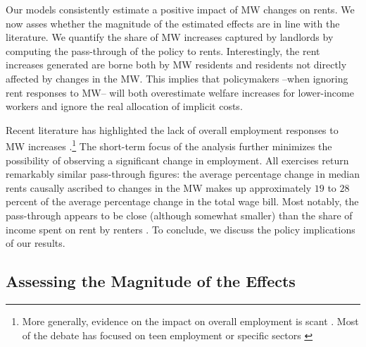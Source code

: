 
Our models consistently estimate a positive impact of MW changes on rents. We now 
asses whether the magnitude of the estimated effects are in line with the literature. 
We quantify the share of MW increases captured by landlords by computing the 
pass-through of the policy to rents. Interestingly, the rent increases generated are 
borne both by MW residents and residents not directly affected by changes in the MW.
This implies that policymakers --when ignoring rent responses to MW-- will both 
overestimate welfare increases for lower-income workers and ignore the real allocation 
of implicit costs. 

Recent literature has highlighted the lack of overall employment responses to MW 
increases \parencite{CegnizEtAl2019}.\footnote{More generally, evidence on the impact on 
	overall employment is scant \parencite{dube2019impacts}. Most of the debate has focused 
	on teen employment \parencite{card1992using, allegretto2017credible} or specific sectors 
	\parencite{katz1992effect, card2000minimum, dube2010minimum}} 
The short-term focus of the analysis further minimizes the possibility of observing a 
significant change in employment. All exercises return remarkably similar pass-through 
figures: the average percentage change in median rents causally ascribed to changes in the 
MW makes up approximately $19$ to $28$ percent of the average percentage change in the total 
wage bill. Most notably, the pass-through appears to be close (although somewhat smaller) 
than the share of income spent on rent by renters \parencite{fernald2020americas}. To conclude, we discuss the 
policy implications of our results.

\subsection{Assessing the Magnitude of the Effects}\label{sec:discussion_benchmarking}

